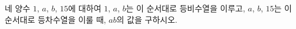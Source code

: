 네 양수 $1$, $a$, $b$, $15$에 대하여 $1$, $a$, $b$는 이 순서대로 등비수열을 이루고, $a$, $b$, $15$는 이 순서대로 등차수열을 이룰 때, $ab$의 값을 구하시오.
